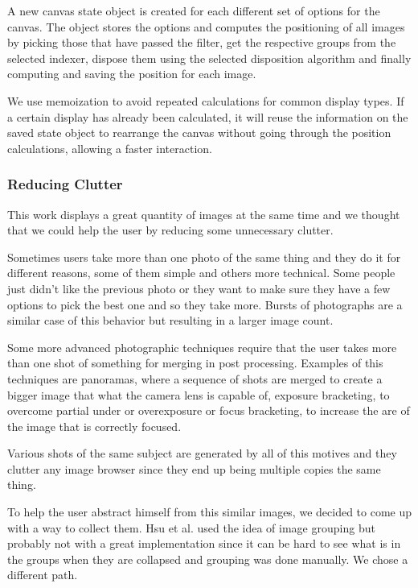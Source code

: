 A new canvas state object is created for each different set of options for the canvas. The object stores the options and computes the positioning of all images by picking those that have passed the filter, get the respective groups from the selected indexer, dispose them using the selected disposition algorithm and finally computing and saving the position for each image.

We use memoization to avoid repeated calculations for common display types. If a certain display has already been calculated, it will reuse the information on the saved state object to rearrange the canvas without going through the position calculations, allowing a faster interaction.


\subsubsection{Reducing Clutter}
\label{ss:stacks}

This work displays a great quantity of images at the same time and we thought that we could help the user by reducing some unnecessary clutter.

Sometimes users take more than one photo of the same thing and they do it for different reasons, some of them simple and others more technical. Some people just didn't like the previous photo or they want to make sure they have a few options to pick the best one and so they take more. Bursts of photographs are a similar case of this behavior but resulting in a larger image count.

Some more advanced photographic techniques require that the user takes more than one shot of something for merging in post processing. Examples of this techniques are panoramas, where a sequence of shots are merged to create a bigger image that what the camera lens is capable of, exposure bracketing, to overcome partial under or overexposure or focus bracketing, to increase the are of the image that is correctly focused.

Various shots of the same subject are generated by all of this motives and they clutter any image browser since they end up being multiple copies the same thing.

To help the user abstract himself from this similar images, we decided to come up with a way to collect them. Hsu et al. \cite{Hsu:2009p2696} used the idea of image grouping but probably not with a great implementation since it can be hard to see what is in the groups when they are collapsed and grouping was done manually. We chose a different path.

